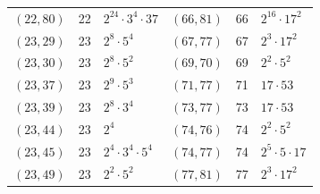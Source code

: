 \documentclass[11pt]{article}
\begin{document}
\begin{longtable}{@{}lrl@{\qquad}lrl@{}}
$(22,80)$ & 22 & $2^{24}\cdot 3^{4}\cdot 37$ & $(66,81)$ & 66 & $2^{16}\cdot 17^{2}$\\
$(23,29)$ & 23 & $2^{8}\cdot 5^{4}$ & $(67,77)$ & 67 & $2^{3}\cdot 17^{2}$\\
$(23,30)$ & 23 & $2^{8}\cdot 5^{2}$ & $(69,70)$ & 69 & $2^{2}\cdot 5^{2}$\\
$(23,37)$ & 23 & $2^{9}\cdot 5^{3}$ & $(71,77)$ & 71 & $17\cdot 53$\\
$(23,39)$ & 23 & $2^{8}\cdot 3^{4}$ & $(73,77)$ & 73 & $17\cdot 53$\\
$(23,44)$ & 23 & $2^{4}$ & $(74,76)$ & 74 & $2^{2}\cdot 5^{2}$\\
$(23,45)$ & 23 & $2^{4}\cdot 3^{4}\cdot 5^{4}$ & $(74,77)$ & 74 & $2^{5}\cdot 5\cdot 17$\\
$(23,49)$ & 23 & $2^{2}\cdot 5^{2}$ & $(77,81)$ & 77 & $2^{3}\cdot 17^{2}$\\
\end{longtable}
\endgroup
\end{document}
